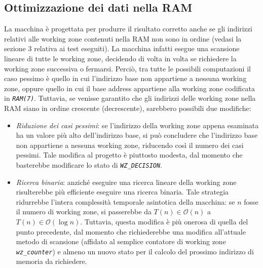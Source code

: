 \documentclass[a4paper,titlepage]{article}
\begin{document}
		\subsection{Ottimizzazione dei dati nella RAM}
			La macchina è progettata per produrre il risultato corretto anche se gli indirizzi relativi alle working zone contenuti nella RAM non sono in ordine (vedasi la sezione 3 relativa ai test eseguiti). La macchina infatti esegue una scansione lineare di tutte le working zone, decidendo di volta in volta se richiedere la working zone successiva o fermarsi. Perciò, tra tutte le possibili computazioni il caso pessimo è quello in cui l'indirizzo base non appartiene a nessuna working zone, oppure quello in cui il base address appartiene alla working zone codificata in \textit{\texttt{RAM(7)}}.
			Tuttavia, se venisse garantito che gli indirizzi delle working zone nella RAM siano in ordine crescente (decrescente), sarebbero possibili due modifiche:
			\begin{itemize}
			\item \textit{Riduzione dei casi pessimi}: se l'indirizzo della working zone appena esaminata ha un valore più alto dell'indirizzo base, si può concludere che l'indirizzo base non appartiene a nessuna working zone, riducendo così il numero dei casi pessimi. Tale modifica al progetto è piuttosto modesta, dal momento che basterebbe modificare lo stato di \textit{\texttt{WZ\_DECISION}}.
			\item \textit{Ricerca binaria}: anziché eseguire una ricerca lineare della working zone risulterebbe più efficiente eseguire una ricerca binaria. Tale strategia ridurrebbe l'intera complessità temporale asintotica della macchina: se $n$ fosse il numero di working zone, si passerebbe da $T(n) \in \mathcal{O}(n)$ a $T(n) \in \mathcal{O}(\log n)$. Tuttavia, questa modifica è più onerosa di quella del punto precedente, dal momento che richiederebbe una modifica all'attuale metodo di scansione (affidato al semplice contatore di working zone \textit{\texttt{wz\_counter}}) e almeno un nuovo stato per il calcolo del prossimo indirizzo di memoria da richiedere.
			\end{itemize}
		
\end{document}
